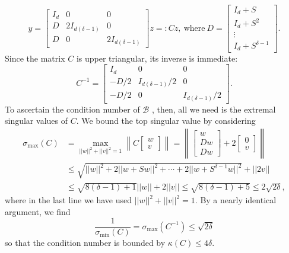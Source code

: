 \[y = \begin{bmatrix} I_d & 0 & 0 \\ D & 2 I_{d(\delta - 1)} & 0 \\ D & 0 & 2 I_{d(\delta - 1)} \end{bmatrix}z =: Cz, \ \text{where} \ D = \begin{bmatrix} I_d + S \\ I_d + S^2 \\ \vdots \\ I_d + S^{\delta - 1} \end{bmatrix}.\]  Since the matrix $C$ is upper triangular, its inverse is immediate: \[C^{-1} = \begin{bmatrix} I_d & 0 & 0 \\ -D / 2 & I_{d(\delta-1)} / 2 & 0 \\ -D / 2 & 0 & I_{d(\delta-1)} / 2 \end{bmatrix}.\]  To ascertain the condition number of $\mathcal{B}$%
, then, all we need is the extremal singular values of $C$.  We bound the top singular value by considering
\begin{align*}
\sigma_{\max}(C) &= \max_{||w||^2 + ||v||^2 = 1} \left\lVert C\begin{bmatrix} w \\ v \end{bmatrix} \right\rVert = \left\lVert \begin{bmatrix} w \\ D w \\ D w \end{bmatrix} + 2\begin{bmatrix} 0 \\ v \end{bmatrix} \right\rVert \\
&\le \sqrt{||w||^2 + 2 ||w + Sw||^2 + \cdots + 2 ||w + S^{\delta - 1} w||^2} + ||2 v|| \\
&\le \sqrt{8 (\delta - 1) + 1}||w|| + 2 ||v|| \le \sqrt{8(\delta - 1) + 5} \le 2\sqrt{2 \delta},
\end{align*}
where in the last line we have used $||w||^2 + ||v||^2 = 1$.  By a nearly identical argument, we find \[\dfrac{1}{\sigma_{\min}(C)} = \sigma_{\max}(C^{-1}) \le \sqrt{2 \delta}\] so that the condition number is bounded by $\kappa(C) \le 4\delta$.
